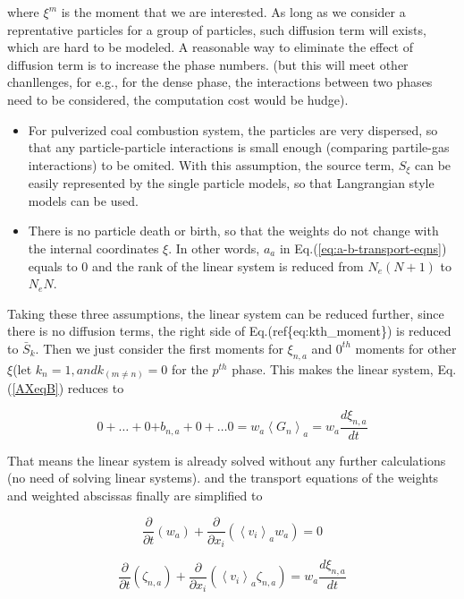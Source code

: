 where $\xi^m$ is the moment that we are interested. As long as we
consider a reprentative particles for a group of particles, such diffusion
term will exists, which are hard to be modeled. A reasonable way to
eliminate the effect of diffusion term is to increase the phase numbers.
(but this will meet other chanllenges, for e.g., for the dense phase,
the interactions between two phases need to be considered, the computation
cost would be hudge).
\begin{itemize}
\item For pulverized coal combustion system, the particles are very dispersed,
so that any particle-particle interactions is small enough (comparing
partile-gas interactions) to be omited. With this assumption, the
source term, $S_\xi$ can be easily represented by the single particle
models, so that Langrangian style models can be used.
\item There is no particle death or birth, so that the weights do not change
with the internal coordinates $\xi$. In other words, $a_a$ in Eq.(\ref{eq:a-b-transport-eqns})
equals to 0 and the rank of the linear system is reduced from $N_e(N+1)$
to $N_eN$.
\end{itemize}
Taking these three assumptions, the linear system can be reduced further,
since there is no diffusion terms, the right side of Eq.(ref\{eq:kth\_moment\})
is reduced to $\bar{S}_k$. Then we just consider the first moments
for $\xi_{n,a}$ and $0^{th}$ moments for other $\xi$(let $k_n=1, and k_(m\neq n)=0$
for the $p^{th}$ phase. This makes the linear system, Eq.(\ref{AXeqB})
reduces to

\begin{equation}
0+\ldots+\text{0+}b_{n,a}+0+\ldots0=w_{a}\left<G_{n}\right>_{a}=w_{a}\frac{d\xi_{n,a}}{dt}
\end{equation}


That means the linear system is already solved without any further
calculations (no need of solving linear systems). and the transport
equations of the weights and weighted abscissas finally are simplified
to

\begin{equation}
\frac{\partial}{\partial t}\left(w_{a}\right)+\frac{\partial}{\partial x_{i}}\left(\left<v_{i}\right>_{a}w_{a}\right)=0\label{eq:ap_transport-simple}
\end{equation}


\begin{equation}
\frac{\partial}{\partial t}\left(\zeta_{n,a}\right)+\frac{\partial}{\partial x_{i}}\left(\left<v_{i}\right>_{a}\zeta_{n,a}\right)=w_{a}\frac{d\xi_{n,a}}{dt}\label{eq:simplified_transport_equation}
\end{equation}


